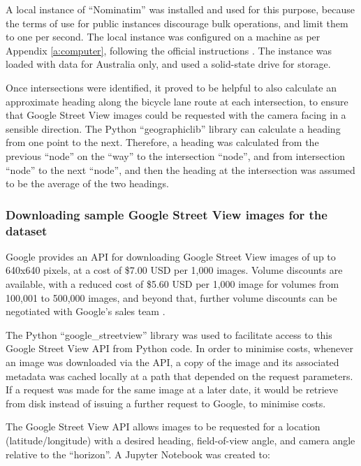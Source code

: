\documentclass[11pt,twoside]{report}
\begin{document}
A local instance of ``Nominatim'' was installed and used for this purpose, because the terms of use for public instances discourage bulk operations, and limit them to one per second.  The local instance was configured on a machine as per Appendix \ref{a:computer}, following the official instructions \cite{nominatim_install}.  The instance was loaded with data for Australia only, and used a solid-state drive for storage.

Once intersections were identified, it proved to be helpful to also calculate an approximate heading along the bicycle lane route at each intersection, to ensure that Google Street View images could be requested with the camera facing in a sensible direction.  The Python ``geographiclib'' library can calculate a heading from one point to the next.  Therefore, a heading was calculated from the previous ``node'' on the ``way'' to the intersection ``node'', and from intersection ``node'' to the next ``node'', and then the heading at the intersection was assumed to be the average of the two headings.


\subsubsection{Downloading sample Google Street View images for the dataset}
\label{s:sample}

Google provides an API for downloading Google Street View images of up to 640x640 pixels, at a cost of \$7.00 USD per 1,000 images.  Volume discounts are available, with a reduced cost of \$5.60 USD per 1,000 image for volumes from 100,001 to 500,000 images, and beyond that, further volume discounts can be negotiated with Google's sales team \cite{gsv_billing}.

The Python ``google\_streetview'' library was used to facilitate access to this Google Street View API from Python code.  In order to minimise costs, whenever an image was downloaded via the API, a copy of the image and its associated metadata was cached locally at a path that depended on the request parameters.  If a request was made for the same image at a later date, it would be retrieve from disk instead of issuing a further request to Google, to minimise costs.

The Google Street View API allows images to be requested for a location (latitude/longitude) with a desired heading, field-of-view angle, and camera angle relative to the ``horizon''.  A Jupyter Notebook was created to:
\end{document}
